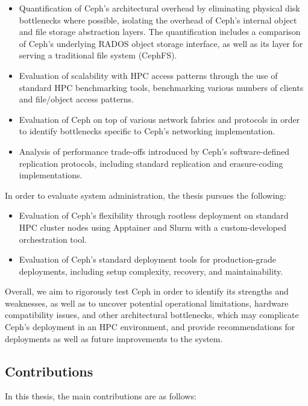 \begin{itemize}
    \item Quantification of Ceph's architectural overhead by eliminating physical disk bottlenecks where possible, isolating the overhead of Ceph's internal object and file storage abstraction layers. The quantification includes a comparison of Ceph's underlying \acs{RADOS} object storage interface, as well as its layer for serving a traditional file system (\acs{CephFS}).
    \item Evaluation of scalability with \ac{HPC} access patterns through the use of standard \ac{HPC} benchmarking tools, benchmarking various numbers of clients and file/object access patterns.
    \item Evaluation of Ceph on top of various network fabrics and protocols in order to identify bottlenecks specific to Ceph's networking implementation.
    \item Analysis of performance trade-offs introduced by Ceph's software-defined replication protocols, including standard replication and erasure-coding implementations.
\end{itemize}

In order to evaluate system administration, the thesis pursues the following:

\begin{itemize}
    \item Evaluation of Ceph's flexibility through rootless deployment on standard \ac{HPC} cluster nodes using Apptainer and Slurm with a custom-developed orchestration tool.
    \item Evaluation of Ceph's standard deployment tools for production-grade deployments, including setup complexity, recovery, and maintainability.
\end{itemize}

Overall, we aim to rigorously test Ceph in order to identify its strengths and weaknesses, as well as to uncover potential operational limitations, hardware compatibility issues, and other architectural bottlenecks, which may complicate Ceph's deployment in an \ac{HPC} environment, and provide recommendations for deployments as well as future improvements to the system.

\subsection{Contributions}

In this thesis, the main contributions are as follows:

